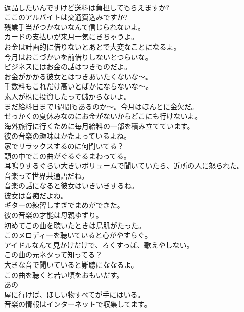 \documentclass[8pt]{extreport}
\begin{document}
\begin{CJK}{UTF8}{min}
\\	返品したいんですけど送料は負担してもらえますか?	
\\	ここのアルバイトは交通費込みですか?	
\\	残業手当がつかないなんて信じられないよ。	
\\	カードの支払いが来月一気にきちゃうよ。	
\\	お金は計画的に借りないとあとで大変なことになるよ。	
\\	今月はおこづかいを前借りしないとつらいな。	
\\	ビジネスにはお金の話はつきものだよ。	
\\	お金がかかる彼女とはつきあいたくないな～。	
\\	手数料もこれだけ高いとばかにならないな～。	
\\	素人が株に投資したって儲からないよ。	
\\	まだ給料日まで1週間もあるのか～。今月はほんとに金欠だ。	
\\	せっかくの夏休みなのにお金がないからどこにも行けないよ。	
\\	海外旅行に行くために毎月給料の一部を積み立てています。	
\\	彼の音楽の趣味はかたよっているよね。	
\\	家でリラックスするのに何聞いてる？	
\\	頭の中でこの曲がぐるぐるまわってる。	
\\	耳鳴りするぐらい大きいボリュームで聞いていたら、近所の人に怒られた。	
\\	音楽って世界共通語だね。	
\\	音楽の話になると彼女はいきいきするね。	
\\	彼女は音痴だよね。	
\\	ギターの練習しすぎでまめができた。	
\\	彼の音楽の才能は母親ゆずり。	
\\	初めてこの曲を聴いたときは鳥肌がたった。	
\\	このメロディーを聴いていると心がやすらぐ。	
\\	アイドルなんて見かけだけで、ろくすっぽ、歌えやしない。	
\\	この曲の元ネタって知ってる？	
\\	大きな音で聞いていると難聴にななるよ。	
\\	この曲を聴くと若い頃をおもいだす。	
\\	あの
\\	屋に行けば、ほしい物すべてが手にはいる。	
\\	音楽の情報はインターネットで収集してます。	

\end{CJK}
\end{document}
